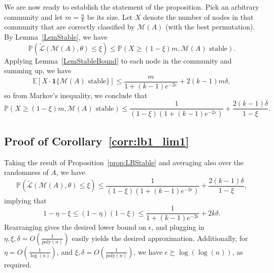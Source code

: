 \documentclass{article}
\newcommand{\eps}{\varepsilon}
\newcommand{\E}{\mathbb{E}}
\newcommand{\calM}{\mathcal{M}}
\begin{document}
We are now ready to establish the statement of the proposition. Pick an arbitrary community and let $m = \frac{n}{k}$ be its size. Let $X$ denote the number of nodes in that community that are correctly classified by $\calM(A)$ (with the best permutation). By Lemma~\ref{LemStable}, we have
$$
\mathbb{P}(\widetilde{\mathcal{L}}(\mathcal{M}(A), \theta) \le \xi) \leq \mathbb{P}(X\geq (1-\xi) m, \calM(A) \text{ stable}).
$$
Applying Lemma~\ref{LemStableBound} to each node in the community and summing up, we have $$\E[X \cdot \mathbf{1}\{\calM(A) \text{ stable}\}]\leq \frac{m}{1+(k-1)e^{-2\eps}} + 2(k - 1)m\delta,$$
so from Markov's inequality, we conclude that
$$
\mathbb{P}(X\geq (1-\xi) m ,\calM(A) \text{ stable}) \leq \frac{1}{(1-\xi)(1+(k-1)e^{-2\eps})} + \frac{2(k - 1)\delta }{1-\xi}.
$$


\subsection{Proof of Corollary~\ref{corr:lb1_lim1}}
\label{AppCorLB}

Taking the result of Proposition~\ref{prop:LBStable} and averaging also over the randomness of $A$, we have
\begin{equation*}
\mathbb{P}(\widetilde{\mathcal{L}}(\mathcal{M}(A), \theta)\leq \xi) \leq \frac{1}{(1-\xi)(1+(k-1)e^{-2\epsilon})} + \frac{2(k - 1)\delta}{1-\xi},
\end{equation*}
implying that
\begin{equation*}
1-\eta-\xi \le (1-\eta)(1-\xi) \le \frac{1}{1+(k-1)e^{-2\epsilon}} + 2k\delta.
\end{equation*}
Rearranging gives the desired lower bound on $\epsilon$, and plugging in $\eta, \xi, \delta = O\left(\frac{1}{\mathrm{poly}(n)}\right)$ easily yields the desired approximation. Additionally, for $\eta = O\left(\frac{1}{\log(n)}\right)$, and $\xi, \delta = O\left(\frac{1}{\mathrm{poly}(n)}\right)$, we have $\epsilon \succsim \log(\log(n))$, as required.




\end{document}
